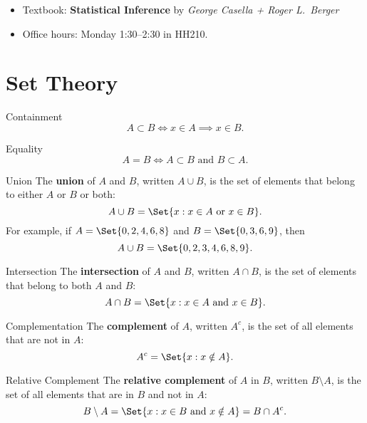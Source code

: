 \begin{itemize}
    \item Textbook: \textbf{Statistical Inference} by
          \emph{George Casella + Roger L.\ Berger}
    \item Office hours: Monday 1:30--2:30 in HH210.
\end{itemize}
\section*{Set Theory}
\begin{Definition}{Containment}{}
    \[ A\subset B\iff x\in A\implies x\in B. \]
\end{Definition}
\begin{Definition}{Equality}{}
    \[ A=B\iff A\subset B\text{ and }B\subset A. \]
\end{Definition}
\begin{Definition}{Union}{}
    The \textbf{union} of $ A $ and $ B $, written $ A\cup B $, is the set of
    elements that belong to either $ A $ or $ B $ or both:
    \[ A\cup B=\Set{x\given x\in A\text{ or } x\in B}. \]
    \tcblower{}
    For example, if $ A=\Set{0,2,4,6,8} $ and $ B=\Set{0,3,6,9} $, then
    \[ A\cup B=\Set{0,2,3,4,6,8,9}. \]
\end{Definition}
\begin{Definition}{Intersection}{}
    The \textbf{intersection} of $ A $ and $ B $, written $ A\cap B $, is the set of elements
    that belong to both $ A $ and $ B $:
    \[ A\cap B=\Set{x\given x\in A\text{ and } x\in B}. \]
\end{Definition}
\begin{Definition}{Complementation}{}
    The \textbf{complement} of $ A $, written $ A^c $, is the set of all elements that are not in $ A $:
    \[ A^c=\Set{x\given x\notin A}. \]
\end{Definition}
\begin{Definition}{Relative Complement}{}
    The \textbf{relative complement} of $ A $ in $ B $, written $ B\setminus A $, is the set of all elements that are in $ B $ and not in $ A $:
    \[ B\setminus A=\Set{x\given x\in B\text{ and } x\notin A}=B\cap A^c. \]
\end{Definition}
